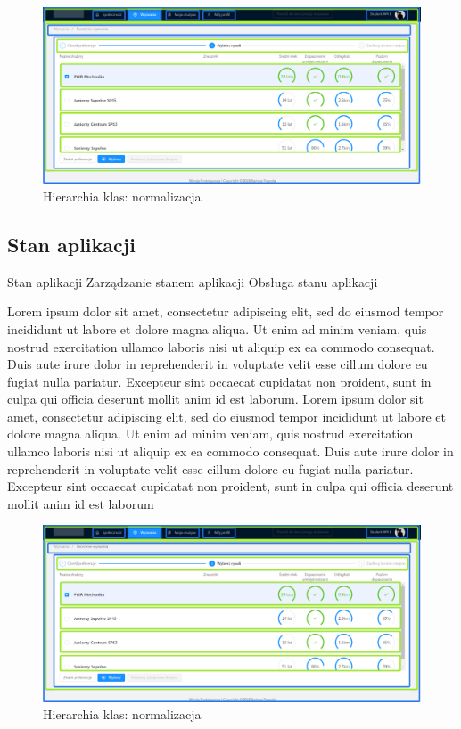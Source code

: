 \begin{figure}[H]
\centering
\includegraphics[width=\linewidth]{06-implementacja/rys/modularyzacja.PNG}
\caption{Hierarchia klas: normalizacja}
\label{fig:criterion-classes}
\end{figure}


\subsection{Stan aplikacji}

Stan aplikacji
Zarządzanie stanem aplikacji Obsługa stanu aplikacji 

Lorem ipsum dolor sit amet, consectetur adipiscing elit, sed do eiusmod tempor incididunt ut labore et dolore magna aliqua. Ut enim ad minim veniam, quis nostrud exercitation ullamco laboris nisi ut aliquip ex ea commodo consequat. Duis aute irure dolor in reprehenderit in voluptate velit esse cillum dolore eu fugiat nulla pariatur. Excepteur sint occaecat cupidatat non proident, sunt in culpa qui officia deserunt mollit anim id est laborum. Lorem ipsum dolor sit amet, consectetur adipiscing elit, sed do eiusmod tempor incididunt ut labore et dolore magna aliqua. Ut enim ad minim veniam, quis nostrud exercitation ullamco laboris nisi ut aliquip ex ea commodo consequat. Duis aute irure dolor in reprehenderit in voluptate velit esse cillum dolore eu fugiat nulla pariatur. Excepteur sint occaecat cupidatat non proident, sunt in culpa qui officia deserunt mollit anim id est laborum

\begin{figure}[H]
\centering
\includegraphics[width=\linewidth]{06-implementacja/rys/modularyzacja.PNG}
\caption{Hierarchia klas: normalizacja}
\label{fig:criterion-classes}
\end{figure}

